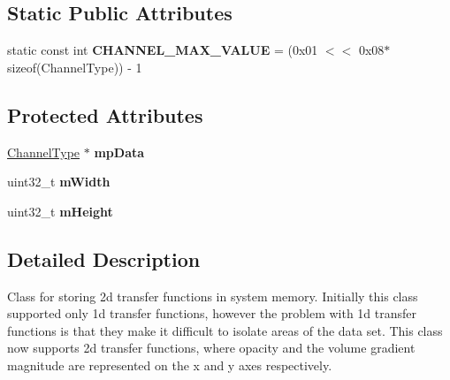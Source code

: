 \subsection*{\-Static \-Public \-Attributes}
\begin{DoxyCompactItemize}
\item 
\hypertarget{class_verdi_1_1_transfer_function_a185000f93745b90102c7d713b1cf04ad}{static const int {\bfseries \-C\-H\-A\-N\-N\-E\-L\-\_\-\-M\-A\-X\-\_\-\-V\-A\-L\-U\-E} = (0x01 $<$$<$ 0x08$\ast$sizeof(\-Channel\-Type)) -\/ 1}\label{class_verdi_1_1_transfer_function_a185000f93745b90102c7d713b1cf04ad}

\end{DoxyCompactItemize}
\subsection*{\-Protected \-Attributes}
\begin{DoxyCompactItemize}
\item 
\hypertarget{class_verdi_1_1_transfer_function_a19568a9346979ef8cfe62ba677a74e99}{\hyperlink{class_verdi_1_1_transfer_function_aebdbb5a13f273ee6d47d1a4dde6d6aa6}{\-Channel\-Type} $\ast$ {\bfseries mp\-Data}}\label{class_verdi_1_1_transfer_function_a19568a9346979ef8cfe62ba677a74e99}

\item 
\hypertarget{class_verdi_1_1_transfer_function_a23bb2249d2eb80974a8502bdec47fb8c}{uint32\-\_\-t {\bfseries m\-Width}}\label{class_verdi_1_1_transfer_function_a23bb2249d2eb80974a8502bdec47fb8c}

\item 
\hypertarget{class_verdi_1_1_transfer_function_a3ddb4deef4a2f7ca257229681f3f1f99}{uint32\-\_\-t {\bfseries m\-Height}}\label{class_verdi_1_1_transfer_function_a3ddb4deef4a2f7ca257229681f3f1f99}

\end{DoxyCompactItemize}


\subsection{\-Detailed \-Description}
\-Class for storing 2d transfer functions in system memory. \-Initially this class supported only 1d transfer functions, however the problem with 1d transfer functions is that they make it difficult to isolate areas of the data set. \-This class now supports 2d transfer functions, where opacity and the volume gradient magnitude are represented on the x and y axes respectively. 

